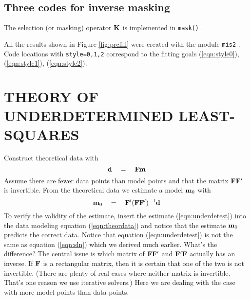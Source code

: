 \subsection{Three codes for inverse masking}
The selection (or masking) operator $\bold K$ is
implemented in
\texttt{mask()} .

All the results shown in Figure \ref{fig:prcfill}
were created with the module
\texttt{mis2} .
Code locations with \texttt{style=0,1,2}
correspond to the fitting goals
(\ref{eqn:style0}), (\ref{eqn:style1}), (\ref{eqn:style2}).
\par



\section{THEORY OF UNDERDETERMINED LEAST-SQUARES}
Construct theoretical data with
\begin{equation}
         \bold d \quad =\quad \bold F \bold m
        \label{eqn:theordata}
\end{equation}
Assume there are fewer data points than model points
and that the matrix $\bold F \bold F'$ is invertible.
From the theoretical data we estimate a model $\bold m_0$ with
\begin{equation}
         \bold m_0 \quad =\quad \bold F' (\bold F \bold F')^{-1} \bold d
        \label{eqn:underdetest}
\end{equation}
To verify the validity of the estimate,
insert the estimate (\ref{eqn:underdetest}) into the
data modeling equation (\ref{eqn:theordata}) and notice
that the estimate $\bold m_0$ predicts the correct data.
Notice that equation
(\ref{eqn:underdetest}) is not the same
as equation (\ref{eqn:sln}) which we derived much earlier.
What's the difference?
The central issue is which matrix of
$\bold F \bold F'$ and
$\bold F' \bold F$ actually has an inverse.
If $\bold F$ is a rectangular matrix,
then it is certain that one of the two is not invertible.
(There are plenty of real cases where neither matrix is invertible.
That's one reason we use iterative solvers.)
Here we are dealing with the case with more model points than data points.

